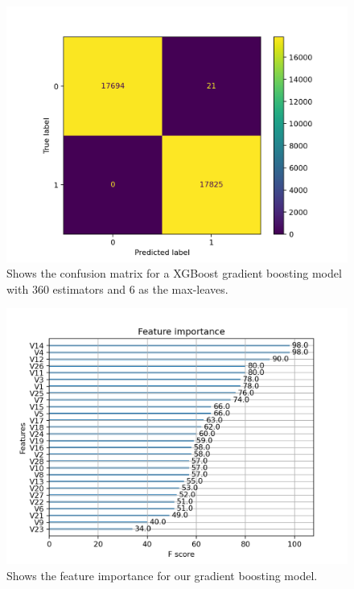 \documentclass{article}
\begin{document}
\begin{figure}
	\centering
	\includegraphics[scale=0.8]{xgb_final_confusion_mat}
	\caption{Shows the confusion matrix for a XGBoost gradient boosting
		model with $360$ estimators and $6$ as the max-leaves.}
	\label{xgbconfusionmat}
\end{figure}
\begin{figure}
	\centering
	\includegraphics[scale=0.8]{xgb_final_importance}
	\caption{Shows the feature importance for our gradient boosting model.}
	\label{xgbimportance}
\end{figure}
\end{document}
